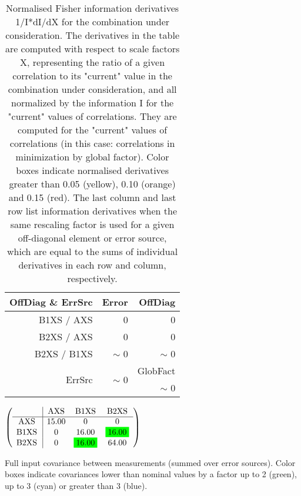\begin{table}[H]
\scriptsize
\begin{center}
\renewcommand{\arraystretch}{1.1}
\begin{tabular}{|r|r|r|}
\hline
 OffDiag \& ErrSrc & {\tiny Error} & OffDiag\\
\hline
B1XS / AXS &  0 &  0 \\
B2XS / AXS &  0 &  0 \\
B2XS / B1XS &  {\tiny $\sim$ }0 &  {\tiny $\sim$ }0 \\
\hline
\multirow{2}{*}{ErrSrc} & \multirow{2}{*}{ {\tiny $\sim$ }0} & GlobFact\\
 & &  {\tiny $\sim$ }0 \\
\hline
\end{tabular}
\renewcommand{\arraystretch}{1}
\caption{Normalised Fisher information derivatives 1/I*dI/dX for the combination under consideration. The derivatives in the table are computed with respect to scale factors X, representing the ratio of a given correlation to its "current" value in the combination under consideration, and all normalized by the information I for the "current" values of correlations. They are computed for the "current" values of correlations (in this case: correlations in minimization by global factor). Color boxes indicate normalised derivatives greater than 0.05 (yellow), 0.10 (orange) and 0.15 (red). The last column and last row list information derivatives when the same rescaling factor is used for a given off-diagonal element or error source, which are equal to the sums of individual derivatives in each row and column, respectively.}
\end{center}
\end{table}
\begin{table}[H]
\scriptsize
\begin{center}
\renewcommand{\arraystretch}{1.1}
\begin{math}\left(\begin{array}{c|ccc}
 & \mathrm{AXS} & 
\mathrm{B1XS} & 
\mathrm{B2XS} \\
\hline
\mathrm{AXS} \hspace*{2pt} &      15.00 &  0 &  0 \\
\mathrm{B1XS} \hspace*{2pt} &  0 &      16.00 &  \colorbox{Green1}{$     16.00$} \\
\mathrm{B2XS} \hspace*{2pt} &  0 &  \colorbox{Green1}{$     16.00$} &      64.00 \\
\end{array}\right)\end{math}
\caption{Full input covariance between measurements (summed over error sources). Color boxes indicate covariances lower than nominal values by a factor up to 2 (green), up to 3 (cyan) or greater than 3 (blue).}
\renewcommand{\arraystretch}{1}
\end{center}
\end{table}
